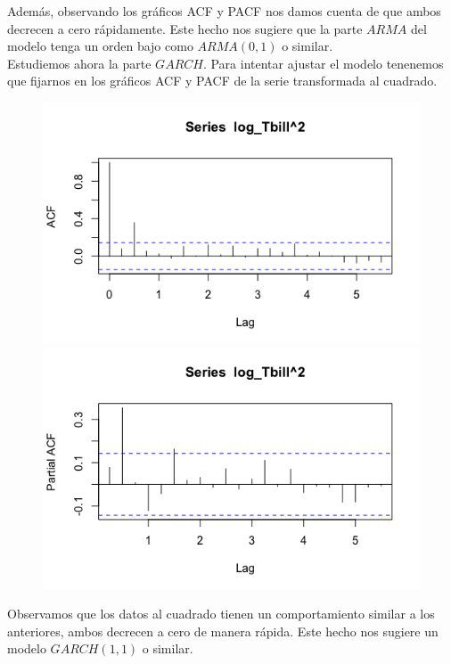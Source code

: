 \documentclass[a4paper,]{article}
\begin{document}
Además, observando los gráficos ACF y PACF nos damos cuenta de que ambos decrecen a cero rápidamente. Este hecho nos sugiere que la parte $ARMA$ del modelo tenga un orden bajo como $ARMA(0,1)$ o similar. \\

Estudiemos ahora la parte $GARCH$. Para intentar ajustar el modelo tenenemos que fijarnos en los gráficos ACF y PACF de la serie transformada al cuadrado. 
\begin{figure}[H]
    \centering
    \includegraphics[width=0.4\linewidth]{logtbill2.png}
    \includegraphics[width=0.4\linewidth]{pacflogtbill2.png}
\end{figure}
Observamos que los datos al cuadrado tienen un comportamiento similar a los anteriores, ambos decrecen a cero de manera rápida. Este hecho nos sugiere un modelo $GARCH(1,1)$ o similar. \\
\end{document}
